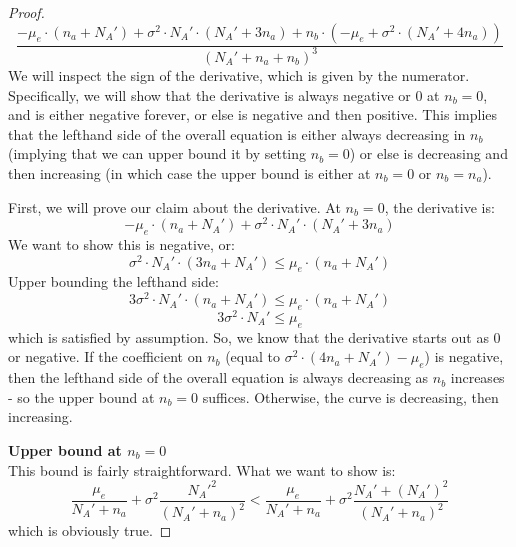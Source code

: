 \documentclass{article}
\newcommand{\cd}[0]{\cdot}
\newcommand{\mue}[0]{\ensuremath{\mu_e}}
\newcommand{\var}[0]{\ensuremath{\sigma^2}}
\newcommand{\ndraw}[0]{\ensuremath{n}}
\newcommand{\total}[0]{\ensuremath{N}}
\begin{document}
\begin{proof}
$$\frac{-\mue \cd (\ndraw_a +\total_A') + \var \cd \total_A'\cd (\total_A' + 3 \ndraw_a) + \ndraw_b \cd (-\mue + \var \cd (\total_A' + 4 \ndraw_a))}{(\total_A' + \ndraw_a + \ndraw_b)^3}$$
We will inspect the sign of the derivative, which is given by the numerator. Specifically, we will show that the derivative is always negative or 0 at $\ndraw_b = 0$, and is either negative forever, or else is negative and then positive. This implies that the lefthand side of the overall equation is either always decreasing in $\ndraw_b$ (implying that we can upper bound it by setting $\ndraw_b = 0$) or else is decreasing and then increasing (in which case the upper bound is either at $\ndraw_b =0$ or $\ndraw_b = \ndraw_a$). 

First, we will prove our claim about the derivative. At $\ndraw_b = 0$, the derivative is: 
$$- \mue \cd (\ndraw_a + \total_A') +\var \cd \total_A'\cd (\total_A' + 3 \ndraw_a) $$
We want to show this is negative, or: 
$$\var \cd \total_A'  \cd (3\ndraw_a  + \total_A') \leq  \mue \cd (\ndraw_a + \total_A') $$
Upper bounding the lefthand side: 
$$3 \var \cd \total_A'  \cd (\ndraw_a  + \total_A') \leq  \mue \cd (\ndraw_a + \total_A') $$
$$3 \var \cd \total_A' \leq  \mue  $$
which is satisfied by assumption. 
So, we know that the derivative starts out as 0 or negative. If the coefficient on $\ndraw_b$ (equal to $\var \cd (4\ndraw_a + \total_A') - \mue$) is negative, then the lefthand side of the overall equation is always decreasing as $\ndraw_b$ increases - so the upper bound at $\ndraw_b=0$ suffices. Otherwise, the curve is decreasing, then increasing. 

\textbf{Upper bound at $\ndraw_b=0$}\\
This bound is fairly straightforward. What we want to show is: 
$$\frac{\mue}{\total_A' + \ndraw_a} + \var \frac{ \total_A'^2}{(\total_A' + \ndraw_a)^2} < \frac{\mue}{\total_A' + \ndraw_a} + \var \frac{\total_A'+ (\total_A')^2}{(\total_A' + \ndraw_a)^2} $$
which is obviously true. 


\end{proof}
\end{document}
